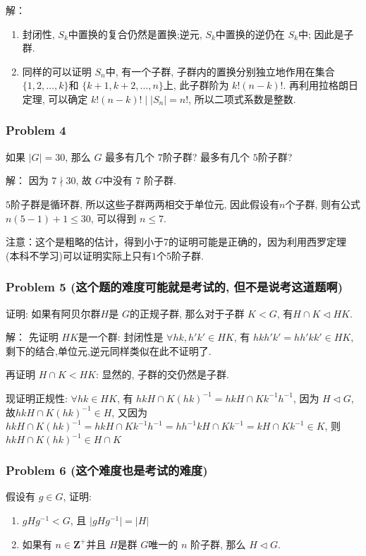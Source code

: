 \documentclass[a4paper,12pt]{ctexart}
\newcommand{\Z}{\mathbf{Z}}
\begin{document}
解：
\begin{enumerate}
  \item 封闭性, $ S_k $中置换的复合仍然是置换;逆元, $ S_k $中置换的逆仍在 $ S_k $中; 因此是子群.
  \item 同样的可以证明 $ S_n $中, 有一个子群, 子群内的置换分别独立地作用在集合 $ \{1,2,\dots,k\} $和 $ \{k+1,k+2,\dots,n\} $上, 此子群阶为 $ k!(n-k)! $. 再利用拉格朗日定理, 可以确定 $ k!(n-k)!\mid |S_n|=n! $, 所以二项式系数是整数. 
\end{enumerate}

\subsubsection*{Problem 4}
如果 $ \lvert G\rvert=30 $, 那么 $ G $ 最多有几个 $ 7 $阶子群? 最多有几个 $ 5 $阶子群?

  解：  因为 $ 7\nmid 30 $, 故 $ G $中没有 $7$ 阶子群.
    
    $ 5 $阶子群是循环群, 所以这些子群两两相交于单位元, 因此假设有$ n $个子群, 则有公式 $ n(5-1)+1\leq 30 $, 可以得到 $ n\leq 7 $.

    注意：这个是粗略的估计，得到小于7的证明可能是正确的，因为利用西罗定理 (本科不学习)可以证明实际上只有$1$个5阶子群.
\subsubsection*{Problem 5 (这个题的难度可能就是考试的, 但不是说考这道题啊)}

证明: 如果有阿贝尔群$ H $是 $ G $的正规子群, 那么对于子群 $ K<G $, 有$ H\cap K\triangleleft HK $.

    解： 先证明 $ HK $是一个群: 封闭性是 $ \forall hk,h'k'\in HK $, 有 $ hkh'k'=hh'kk'\in HK $, 剩下的结合,单位元,逆元同样类似在此不证明了.

     再证明 $ H\cap K<HK $: 显然的, 子群的交仍然是子群.

     现证明正规性: $ \forall hk\in HK $, 有 $ hkH\cap K(hk)^{-1}=hkH\cap Kk^{-1}h^{-1} $, 因为
    $ H\triangleleft G $,  故$ hkH\cap K(hk)^{-1}\in H $, 又因为 $ hkH\cap K(hk)^{-1}=hkH\cap Kk^{-1}h^{-1}=hh^{-1}kH\cap Kk^{-1}=kH\cap Kk^{-1}\in K $, 则$ hkH\cap K(hk)^{-1}\in H\cap K $
     
\subsubsection*{Problem 6 (这个难度也是考试的难度)}

假设有 $ g\in G $, 证明:
    \begin{enumerate}
      \item $ gHg^{-1}<G $, 且 $ \lvert gHg^{-1}\rvert=\lvert H\rvert $
      \item 如果有 $ n\in\Z^+ $并且 $ H $是群 $ G $唯一的 $ n $ 阶子群, 那么 $ H \triangleleft G$.
    \end{enumerate}
    
\end{document}
